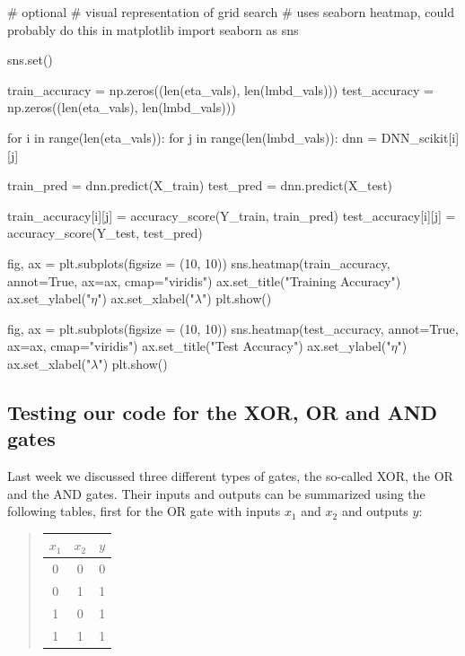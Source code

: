 \documentclass[%
oneside,                 %
final,                   %
10pt]{article}
\begin{document}
\bpycod
# optional
# visual representation of grid search
# uses seaborn heatmap, could probably do this in matplotlib
import seaborn as sns

sns.set()

train_accuracy = np.zeros((len(eta_vals), len(lmbd_vals)))
test_accuracy = np.zeros((len(eta_vals), len(lmbd_vals)))

for i in range(len(eta_vals)):
    for j in range(len(lmbd_vals)):
        dnn = DNN_scikit[i][j]
        
        train_pred = dnn.predict(X_train) 
        test_pred = dnn.predict(X_test)

        train_accuracy[i][j] = accuracy_score(Y_train, train_pred)
        test_accuracy[i][j] = accuracy_score(Y_test, test_pred)

        
fig, ax = plt.subplots(figsize = (10, 10))
sns.heatmap(train_accuracy, annot=True, ax=ax, cmap="viridis")
ax.set_title("Training Accuracy")
ax.set_ylabel("$\eta$")
ax.set_xlabel("$\lambda$")
plt.show()

fig, ax = plt.subplots(figsize = (10, 10))
sns.heatmap(test_accuracy, annot=True, ax=ax, cmap="viridis")
ax.set_title("Test Accuracy")
ax.set_ylabel("$\eta$")
ax.set_xlabel("$\lambda$")
plt.show()

\epycod


\subsection{Testing our code for the XOR, OR and AND gates}

Last week we discussed three different types of gates, the so-called
XOR, the OR and the AND gates.  Their inputs and outputs can be
summarized using the following tables, first for the OR gate with
inputs $x_1$ and $x_2$ and outputs $y$:


\begin{quote}
\begin{tabular}{ccc}
\hline
\multicolumn{1}{c}{ $x_1$ } & \multicolumn{1}{c}{ $x_2$ } & \multicolumn{1}{c}{ $y$ } \\
\hline
0     & 0     & 0   \\
0     & 1     & 1   \\
1     & 0     & 1   \\
1     & 1     & 1   \\
\hline
\end{tabular}
\end{quote}

\noindent
\end{document}
